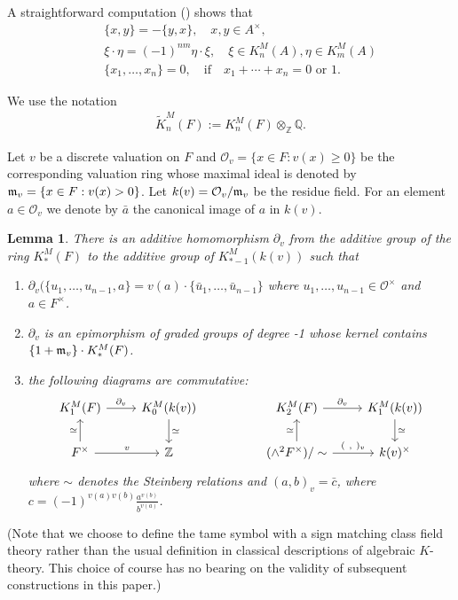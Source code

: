 \documentclass[12pt,amstex,amssymb]{article}
\theoremstyle{plain}
\newtheorem{lemma}[theorem]{Lemma}
\theoremstyle{definition}
\def\cO{\mathcal {O}}
\def\Z{{\mathbb Z}}
\def\Q{{\mathbb Q}}
\newcommand{\be}{\begin{eqnarray*}}
\newcommand{\ee}{\end{eqnarray*}}
\begin{document}
A straightforward computation (\cite[Lemma 1.1]{Sus}) shows that 
\begin{eqnarray*}
&&\{x,y\} = -\{y, x\}, \quad x,y \in A^\times, \\
&&\xi \cdot\eta = (-1)^{nm} \eta \cdot \xi, \quad \xi \in K^M_n(A), \eta \in K^M_m(A)\\
&&\{x_1, \ldots, x_n\}=0, \quad \text{if} \quad x_1+\cdots+x_n=0 \text{ or } 1. 
\end{eqnarray*}

We use the notation
\be
\tilde K^M_n(F):=K^M_n(F) \otimes_\Z \Q.
\ee

Let $v$ be a discrete valuation on $F$ and $\cO_v=\{x \in F : v(x) \geq 0\}$ be the corresponding valuation ring whose maximal ideal is denoted by $\frak m_v=\{x \in F : v(x) > 0\}$.
Let $k(v)=\cO_v/\frak m_v$ be the residue field.
For an element $a \in \cO_v$ we denote by $\bar a$ the canonical image of $a$ in $k(v)$.

\begin{lemma}\cite[Lemma 1.3]{Sus} \label{boundary}
There is an additive homomorphism $\partial_v$ from the additive group of the ring $K^M_\ast(F)$ to the additive group of $K^M_{\ast-1}(k(v))$ such that
\begin{enumerate}[(1)]
\item $\partial_v (\{u_1, \ldots, u_{n-1}, a\} = v(a) \cdot \{ \bar u_1, \ldots, \bar u_{n-1}\}$ where $u_1, \ldots, u_{n-1} \in \cO^\times$ and $a \in F^\times$.
\item $\partial_v$ is an epimorphism of graded groups of degree -1 whose kernel contains $\{1 + \frak m_v\}\cdot K^M_\ast (F)$.
\item the following diagrams are commutative:
\[\begin{tikzcd}
	{K^M_1(F)} & {K^M_0(k(v))} && {K^M_2(F)} & {K^M_1(k(v))} \\
	{F^\times} & \Z && {(\wedge^2 F^\times)/\sim} & {k(v)^\times}
	\arrow["{\partial_v}", from=1-1, to=1-2]
	\arrow["{\partial_v}", from=1-4, to=1-5]
	\arrow["v", from=2-1, to=2-2]
	\arrow["{( \ ,\ )_v}", from=2-4, to=2-5]
	\arrow["\simeq", from=2-1, to=1-1]
	\arrow["\simeq", from=1-2, to=2-2]
	\arrow["\simeq", from=2-4, to=1-4]
	\arrow["\simeq", from=1-5, to=2-5]
\end{tikzcd}\]
where $\sim$ denotes the Steinberg relations and $(a,b)_v =\bar c$, where $c=(-1)^{v(a)v(b)}\frac{a^{v(b)}}{b^{v(a)}}$.  
\end{enumerate}
\end{lemma}
(Note that we choose to define the tame symbol with a sign matching class field theory rather than the usual definition in classical descriptions of algebraic $K$-theory.  This choice of course has no bearing on the validity of subsequent constructions in this paper.)
\end{document}
